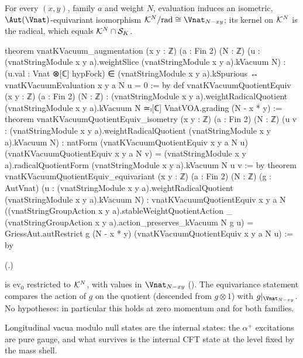 \begin{theorem}\label{ch18:thm:kquotient}
For every $(x,y)$, family $a$ and weight $N$, evaluation induces an isometric, $\Aut(\Vnat)$-equivariant
isomorphism $\chXVIIIK^N/\mathrm{rad}\cong\Vnat_{N-xy}$; its kernel on $\mathcal{K}^N$ is the radical, which equals
$\mathcal{K}^N\cap\mathcal{S}_K$.
\end{theorem}
\begin{leancode}
theorem vnatKVacuum_augmentation (x y : ℤ) (a : Fin 2) (N : ℤ)
    (u : (vnatStringModule x y a).weightSlice (vnatStringModule x y a).kVacuum N) :
    (u.val : Vnat ⊗[ℂ] hypFock) ∈ (vnatStringModule x y a).kSpurious ↔
      vnatKVacuumEvaluation x y a N u = 0 := by
def vnatKVacuumQuotientEquiv (x y : ℤ) (a : Fin 2) (N : ℤ) :
    (vnatStringModule x y a).weightRadicalQuotient (vnatStringModule x y a).kVacuum N ≃ₗ[ℂ]
      VnatVOA.grading (N - x * y) :=
theorem vnatKVacuumQuotientEquiv_isometry (x y : ℤ) (a : Fin 2) (N : ℤ)
    (u v : (vnatStringModule x y a).weightRadicalQuotient (vnatStringModule x y a).kVacuum N) :
    natForm (vnatKVacuumQuotientEquiv x y a N u) (vnatKVacuumQuotientEquiv x y a N v) =
      (vnatStringModule x y a).radicalQuotientForm (vnatStringModule x y a).kVacuum N u v := by
theorem vnatKVacuumQuotientEquiv_equivariant (x y : ℤ) (a : Fin 2) (N : ℤ) (g : AutVnat)
    (u : (vnatStringModule x y a).weightRadicalQuotient (vnatStringModule x y a).kVacuum N) :
    vnatKVacuumQuotientEquiv x y a N
      ((vnatStringGroupAction x y a).stableWeightQuotientAction _
        (vnatStringGroupAction x y a).action_preserves_kVacuum N g u) =
      GriessAut.autRestrict g (N - x * y) (vnatKVacuumQuotientEquiv x y a N u) := by
\end{leancode}
(.)
\begin{dictionary}
 is $\mathrm{ev}_0$ restricted to $\mathcal{K}^N$, with values in
$\Vnat_{N-xy}$ ().  The equivariance statement compares the action of $g$ on the
quotient (descended from $g\otimes1$) with $g|_{\Vnat_{N-xy}}$.  No hypotheses: in particular this holds
at zero momentum and for both families.
\end{dictionary}
\begin{physics}
Longitudinal vacua modulo null states are the internal states: the $\alpha^+$ excitations are pure
gauge, and what survives is the internal CFT state at the level fixed by the mass shell.
\end{physics}
